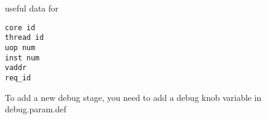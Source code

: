useful data for 

\begin{Verbatim}
core id
thread id
uop num
inst num
vaddr
req_id
\end{Verbatim}


To add a new debug stage, you need to add a debug knob variable in debug.param.def
















